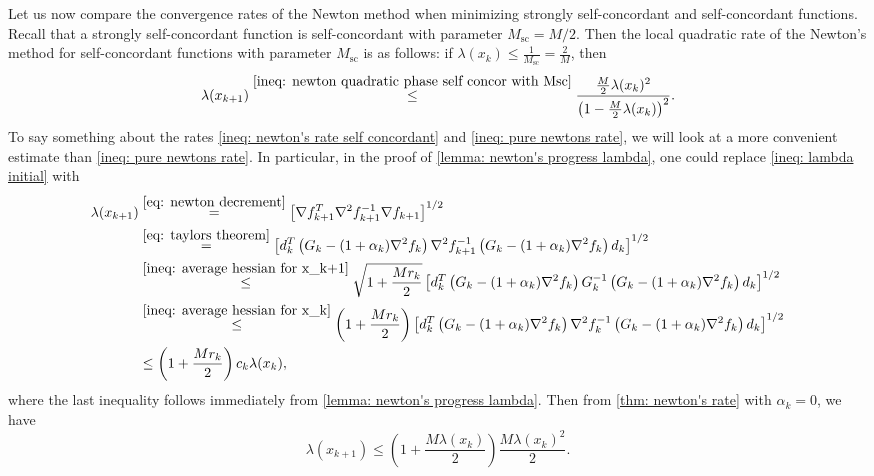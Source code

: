 \documentclass[sn-mathphys-num]{sn-jnl}%
\theoremstyle{thmstyleone}%
\theoremstyle{thmstyletwo}%
\theoremstyle{thmstylethree}%
\numberwithin{equation}{section}
\begin{document}
Let us now compare the convergence rates of the Newton method when minimizing strongly self-concordant and self-concordant functions. Recall that a strongly self-concordant function is self-concordant with parameter $M_\text{sc}=M/2$. Then the local quadratic rate of the Newton's method for self-concordant functions with parameter $M_\text{sc}$ is as follows: if $\lambda(x_{k})  \leq \frac{1}{M_\text{sc}} =\frac{2}{M}$, then
\begin{equation} \label{ineq: newton's rate self concordant}
    \lambda(x_{k+1}) \overset{\eqref{ineq: newton quadratic phase self concor with Msc}}{\leq} \frac{\frac{M}{2}\lambda(x_{k})^2}{\left(1-\frac{M}{2}\lambda(x_{k})\right)^2}.
\end{equation}
To say something about the rates \eqref{ineq: newton's rate self concordant} and \eqref{ineq: pure newtons rate}, we will look at a more convenient estimate than \eqref{ineq: pure newtons rate}. In particular, in the proof of \cref{lemma: newton's progress lambda}, one could replace \eqref{ineq: lambda initial} with 
\begin{align*}
    \lambda(x_{k+1}) & \overset{\eqref{eq: newton decrement}}{=} \left[\nabla f_{k+1}^T \nabla^2 f_{k+1}^{-1} \nabla f_{k+1}\right]^{1/2} \\
    & \overset{\eqref{eq: taylors theorem}}{=} \left[d_k^T \left(G_k - (1 + \alpha_k) \nabla^2 f_{k}\right) \nabla^2 f_{k+1}^{-1} \left(G_k - (1 + \alpha_k) \nabla^2 f_{k}\right) d_k \right]^{1/2} \\
    & \overset{\eqref{ineq: average hessian for x_k+1}}{\leq} \sqrt{1 + \frac{M r_k}{2}}
\left[d_k^T \left(G_k - (1 + \alpha_k) \nabla^2 f_{k} \right) G_k^{-1} \left(G_k - (1 + \alpha_k) \nabla^2 f_{k}\right) d_k \right]^{1/2} \\
& \overset{\eqref{ineq: average hessian for x_k}}{\leq} \left(1 + \frac{M r_k}{2}\right)
\left[d_k^T \left(G_k - (1 + \alpha_k) \nabla^2 f_{k}\right) \nabla^2 f_{k}^{-1} \left(G_k - (1 + \alpha_k) \nabla^2 f_{k}\right) d_k \right]^{1/2}\\
& \leq \left(1 + \frac{M r_k}{2}\right) c_k \lambda(x_{k}),
\end{align*}
where the last inequality follows immediately from  \cref{lemma: newton's progress lambda}. Then from \cref{thm: newton's rate} with $\alpha_k=0$, we have 
\begin{equation}
        \lambda(x_{k+1}) \leq \left(1 + \frac{M\lambda(x_k)}{2}\right)\frac{M \lambda(x_k)^2}{2}. \label{ineq: newton rate no 2}
\end{equation}
\end{document}
